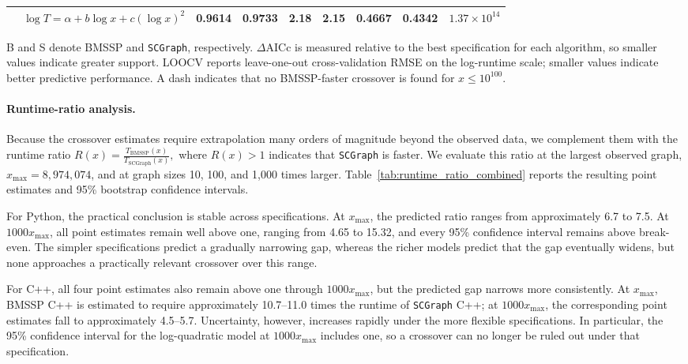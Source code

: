 \documentclass[ijoc,blindrev]{informs3} %
\begin{document}
\begin{APPENDICES}
{\begin{table}[!ht]
{\begin{tabular}{llccccccc}
& \(\log T=\alpha+b\log x+c(\log x)^2\)
& 0.9614 & 0.9733
& 2.18 & 2.15
& 0.4667 & 0.4342
& \(1.37\times10^{14}\) \\

\bottomrule
\end{tabular}
}
\begin{flushleft}
\footnotesize
B and S denote BMSSP and \texttt{SCGraph}, respectively.
\(\Delta\mathrm{AICc}\) is measured relative to the best specification for each algorithm, so smaller values indicate greater support.
LOOCV reports leave-one-out cross-validation RMSE on the log-runtime scale; smaller values indicate better predictive performance.
A dash indicates that no BMSSP-faster crossover is found for \(x\leq10^{100}\).
\end{flushleft}
\end{table}

\paragraph{Runtime-ratio analysis.}
Because the crossover estimates require extrapolation many orders of magnitude beyond the observed data, we complement them with the runtime ratio
\(
R(x)=\frac{T_{\mathrm{BMSSP}}(x)}{T_{\mathrm{SCGraph}}(x)},
\)
where \(R(x)>1\) indicates that \texttt{SCGraph} is faster. We evaluate this ratio at the largest observed graph, \(x_{\max}=8{,}974{,}074\), and at graph sizes 10, 100, and 1,000 times larger. Table~\ref{tab:runtime_ratio_combined} reports the resulting point estimates and 95\% bootstrap confidence intervals.

For Python, the practical conclusion is stable across specifications. At \(x_{\max}\), the predicted ratio ranges from approximately 6.7 to 7.5. At \(1000x_{\max}\), all point estimates remain well above one, ranging from 4.65 to 15.32, and every 95\% confidence interval remains above break-even. The simpler specifications predict a gradually narrowing gap, whereas the richer models predict that the gap eventually widens, but none approaches a practically relevant crossover over this range.

For C++, all four point estimates also remain above one through \(1000x_{\max}\), but the predicted gap narrows more consistently. At \(x_{\max}\), BMSSP C++ is estimated to require approximately 10.7--11.0 times the runtime of \texttt{SCGraph} C++; at \(1000x_{\max}\), the corresponding point estimates fall to approximately 4.5--5.7. Uncertainty, however, increases rapidly under the more flexible specifications. In particular, the 95\% confidence interval for the log-quadratic model at \(1000x_{\max}\) includes one, so a crossover can no longer be ruled out under that specification.

}
\end{APPENDICES}
\end{document}
